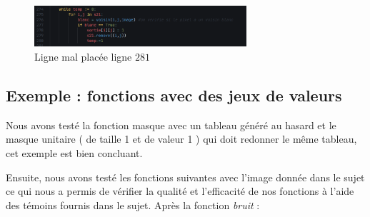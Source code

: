 \documentclass[hidelinks,11pt]{article}
\theoremstyle{mytheoremstyle}
\theoremstyle{mytheoremstyle}
\theoremstyle{myproblemstyle}
\begin{document}
    \begin{figure}[h]
        \centering
        \includegraphics[width=0.7\textwidth]{figs/fig5}
        \caption{Ligne mal placée ligne $281$ \cite{git-ligne}}
    \end{figure}

    \subsection{Exemple : fonctions avec des jeux de valeurs}

    Nous avons testé la fonction masque avec un tableau généré au hasard et le masque unitaire ( de taille 1 et de valeur 1 ) 
    qui doit redonner le même tableau, cet exemple est bien concluant.

    Ensuite, nous avons testé les fonctions suivantes avec l’image donnée dans le sujet ce qui nous a permis de vérifier la qualité et 
    l’efficacité de nos fonctions à l’aide des témoins fournis dans le sujet.
    Après la fonction \textit{bruit }:
\end{document}
